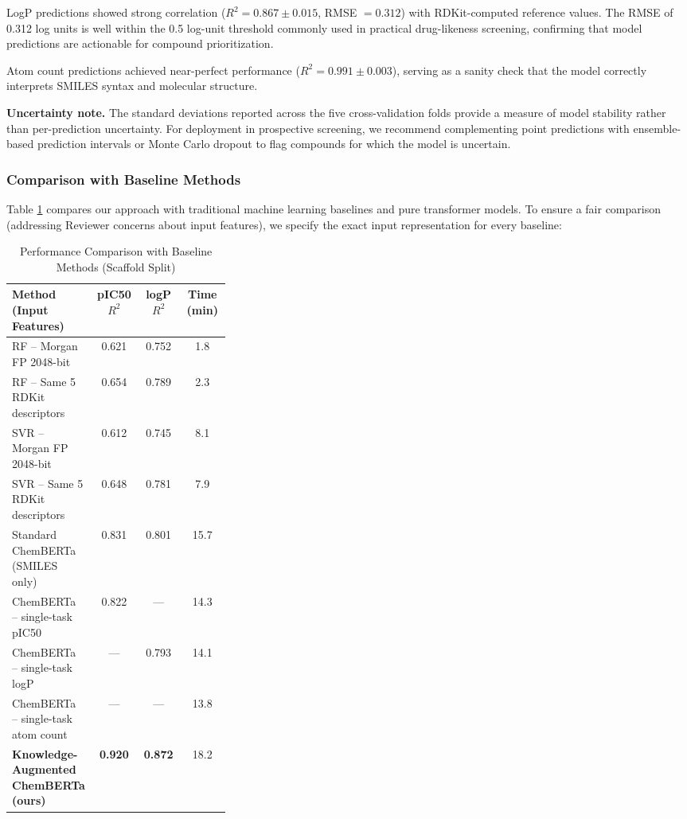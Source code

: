 \documentclass[preprint,12pt]{elsarticle}
\begin{document}
LogP predictions showed strong correlation ($R^2 = 0.867 \pm 0.015$, RMSE $= 0.312$) with RDKit-computed reference values. The RMSE of 0.312 log units is well within the 0.5 log-unit threshold commonly used in practical drug-likeness screening, confirming that model predictions are actionable for compound prioritization.

Atom count predictions achieved near-perfect performance ($R^2 = 0.991 \pm 0.003$), serving as a sanity check that the model correctly interprets SMILES syntax and molecular structure.

\textbf{Uncertainty note.}
The standard deviations reported across the five cross-validation folds provide a measure of model stability rather than per-prediction uncertainty. For deployment in prospective screening, we recommend complementing point predictions with ensemble-based prediction intervals or Monte Carlo dropout to flag compounds for which the model is uncertain.

\subsubsection*{Comparison with Baseline Methods}

Table \ref{tab:comparison} compares our approach with traditional machine learning baselines and pure transformer models. To ensure a fair comparison (addressing Reviewer concerns about input features), we specify the exact input representation for every baseline:

\begin{table}[H]
\centering
\caption{Performance Comparison with Baseline Methods (Scaffold Split)}
\label{tab:comparison}
\small
\begin{tabular}{p{0.32\linewidth} c c c}
\toprule
\textbf{Method (Input Features)} & \textbf{pIC50 $R^2$} & \textbf{logP $R^2$} & \textbf{Time (min)} \\
\midrule
RF -- Morgan FP 2048-bit & 0.621 & 0.752 & 1.8 \\
RF -- Same 5 RDKit descriptors & 0.654 & 0.789 & 2.3 \\
SVR -- Morgan FP 2048-bit & 0.612 & 0.745 & 8.1 \\
SVR -- Same 5 RDKit descriptors & 0.648 & 0.781 & 7.9 \\
Standard ChemBERTa (SMILES only) & 0.831 & 0.801 & 15.7 \\
ChemBERTa -- single-task pIC50 & 0.822 & --- & 14.3 \\
ChemBERTa -- single-task logP & --- & 0.793 & 14.1 \\
ChemBERTa -- single-task atom count & --- & --- & 13.8 \\
\textbf{Knowledge-Augmented ChemBERTa (ours)} & \textbf{0.920} & \textbf{0.872} & 18.2 \\
\bottomrule
\end{tabular}
\end{table}
\end{document}
